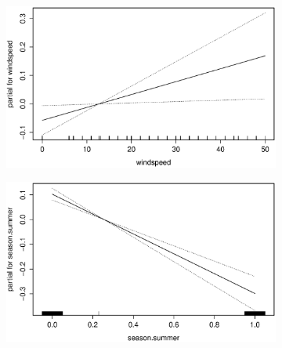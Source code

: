 \begin{figure}[H]
        \medskip
        \begin{subfigure}{0.4\textwidth}
          \includegraphics[width=\columnwidth]{images/non-linear/gam/gam-windspeed.eps}
        \end{subfigure}
        \hspace*{\fill}
        \begin{subfigure}{.4\textwidth}
          \includegraphics[width=\columnwidth]{images/non-linear/gam/gam-summer.eps}
        \end{subfigure}


\end{figure}
